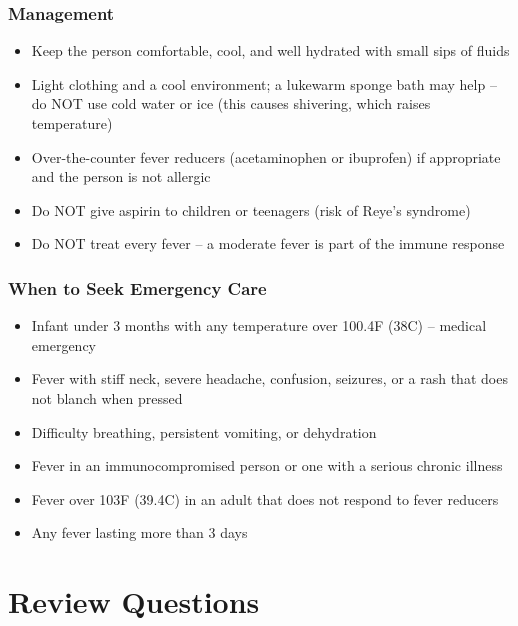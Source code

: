\subsubsection{Management}

\begin{itemize}[leftmargin=*]
\item Keep the person comfortable, cool, and well hydrated with small sips of fluids
\item Light clothing and a cool environment; a lukewarm sponge bath may help -- do NOT use cold water or ice (this causes shivering, which raises temperature)
\item Over-the-counter fever reducers (acetaminophen or ibuprofen) if appropriate and the person is not allergic
\item Do NOT give aspirin to children or teenagers (risk of Reye's syndrome)
\item Do NOT treat every fever -- a moderate fever is part of the immune response
\end{itemize}

\subsubsection{When to Seek Emergency Care}

\begin{itemize}[leftmargin=*]
\item Infant under 3 months with any temperature over 100.4\textdegree F (38\textdegree C) -- medical emergency
\item Fever with stiff neck, severe headache, confusion, seizures, or a rash that does not blanch when pressed
\item Difficulty breathing, persistent vomiting, or dehydration
\item Fever in an immunocompromised person or one with a serious chronic illness
\item Fever over 103\textdegree F (39.4\textdegree C) in an adult that does not respond to fever reducers
\item Any fever lasting more than 3 days
\end{itemize}

\section{Review Questions}

